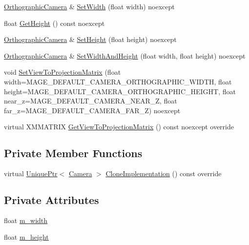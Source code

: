 \begin{DoxyCompactItemize}
\hyperlink{classmage_1_1_orthographic_camera}{Orthographic\+Camera} \& \hyperlink{classmage_1_1_orthographic_camera_a58bed7c00cc72a9d5cd1e3711aba2927}{Set\+Width} (float width) noexcept
\item 
float \hyperlink{classmage_1_1_orthographic_camera_ac9ee4cae43058876aa5ff77db75a9e25}{Get\+Height} () const noexcept
\item 
\hyperlink{classmage_1_1_orthographic_camera}{Orthographic\+Camera} \& \hyperlink{classmage_1_1_orthographic_camera_a015e8dbc6cf3fcb199626db1069d791d}{Set\+Height} (float height) noexcept
\item 
\hyperlink{classmage_1_1_orthographic_camera}{Orthographic\+Camera} \& \hyperlink{classmage_1_1_orthographic_camera_a0166ea43bbaebbc2fcd8684789d887d5}{Set\+Width\+And\+Height} (float width, float height) noexcept
\item 
void \hyperlink{classmage_1_1_orthographic_camera_af0c39e7ad5271f1b78437aa54275c3e3}{Set\+View\+To\+Projection\+Matrix} (float width=M\+A\+G\+E\+\_\+\+D\+E\+F\+A\+U\+L\+T\+\_\+\+C\+A\+M\+E\+R\+A\+\_\+\+O\+R\+T\+H\+O\+G\+R\+A\+P\+H\+I\+C\+\_\+\+W\+I\+D\+TH, float height=M\+A\+G\+E\+\_\+\+D\+E\+F\+A\+U\+L\+T\+\_\+\+C\+A\+M\+E\+R\+A\+\_\+\+O\+R\+T\+H\+O\+G\+R\+A\+P\+H\+I\+C\+\_\+\+H\+E\+I\+G\+HT, float near\+\_\+z=M\+A\+G\+E\+\_\+\+D\+E\+F\+A\+U\+L\+T\+\_\+\+C\+A\+M\+E\+R\+A\+\_\+\+N\+E\+A\+R\+\_\+Z, float far\+\_\+z=M\+A\+G\+E\+\_\+\+D\+E\+F\+A\+U\+L\+T\+\_\+\+C\+A\+M\+E\+R\+A\+\_\+\+F\+A\+R\+\_\+Z) noexcept
\item 
virtual X\+M\+M\+A\+T\+R\+IX \hyperlink{classmage_1_1_orthographic_camera_a970dc089a2463d74ae186884fa2b9b0c}{Get\+View\+To\+Projection\+Matrix} () const noexcept override
\end{DoxyCompactItemize}
\subsection*{Private Member Functions}
\begin{DoxyCompactItemize}
\item 
virtual \hyperlink{namespacemage_a8c307fbcc33bce9b7f2aa4c26c3b95cf}{Unique\+Ptr}$<$ \hyperlink{classmage_1_1_camera}{Camera} $>$ \hyperlink{classmage_1_1_orthographic_camera_aeef89cff8f4272b1412fa3ce366e656d}{Clone\+Implementation} () const override
\end{DoxyCompactItemize}
\subsection*{Private Attributes}
\begin{DoxyCompactItemize}
\item 
float \hyperlink{classmage_1_1_orthographic_camera_aadef4cff19cc1b1ecf427f82bbc3ea6a}{m\+\_\+width}
\item 
float \hyperlink{classmage_1_1_orthographic_camera_a63169098f604874c1b30c4b276b5a3e1}{m\+\_\+height}
\end{DoxyCompactItemize}
